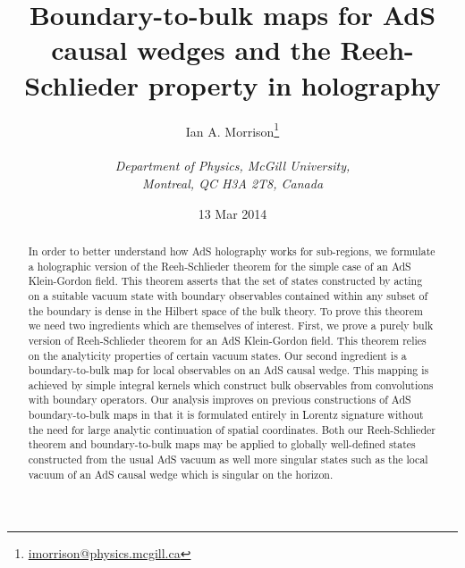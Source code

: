 \documentclass[12pt]{article}
\numberwithin{equation}{section}
\begin{document}
\date{13 Mar 2014}
\title{Boundary-to-bulk maps for AdS causal wedges
and the Reeh-Schlieder property in holography}

\author{Ian A. Morrison\thanks{
    \href{mailto:imorrison@physics.mcgill.ca}
    {imorrison@physics.mcgill.ca}
  }
  \\ \\
  {\it Department of Physics, McGill University, } \\
  {\it Montreal, QC H3A 2T8, Canada }
}

\maketitle


\begin{abstract}
  In order to better understand how AdS holography works for
  sub-regions, we formulate a holographic version of the Reeh-Schlieder 
  theorem for the simple case of an AdS Klein-Gordon field.
  This theorem asserts that the set of states constructed by acting 
  on a suitable vacuum state with boundary observables contained
  within any subset of the boundary is dense in the Hilbert space 
  of the bulk theory.
  To prove this theorem we need two ingredients which are themselves
  of interest. First, we prove a purely bulk version of Reeh-Schlieder
  theorem for an AdS Klein-Gordon field. This theorem relies on the 
  analyticity properties of certain vacuum states.
  Our second ingredient is a boundary-to-bulk map for local observables
  on an AdS causal wedge.
  This mapping is achieved by simple integral kernels
  which construct bulk observables from convolutions with 
  boundary operators.
  Our analysis improves on previous constructions of AdS boundary-to-bulk
  maps in that it is formulated entirely in Lorentz signature 
  without the need for large analytic continuation of spatial coordinates.
  Both our Reeh-Schlieder theorem and boundary-to-bulk maps
  may be applied to globally well-defined states
  constructed from the usual AdS vacuum as well more
  singular states such as the local vacuum of an AdS causal wedge
  which is singular on the horizon.
\end{abstract}
\end{document}
